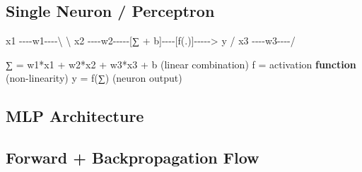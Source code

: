 \documentclass[11pt]{article}
\newenvironment{Shaded}{\begin{snugshade}}{\end{snugshade}}
\newcommand{\FunctionTok}[1]{\textcolor[rgb]{0.56,0.27,0.68}{#1}}
\newcommand{\KeywordTok}[1]{\textcolor[rgb]{0.81,0.81,0.76}{\textbf{#1}}}
\newcommand{\NormalTok}[1]{\textcolor[rgb]{0.81,0.81,0.76}{#1}}
\newcommand{\OperatorTok}[1]{\textcolor[rgb]{0.81,0.81,0.76}{#1}}
\newcommand{\SpecialStringTok}[1]{\textcolor[rgb]{0.85,0.27,0.33}{#1}}
\begin{document}
\subsection{Single Neuron / Perceptron}\label{single-neuron--perceptron}


\begin{Shaded}
\begin{Highlighting}[]
\NormalTok{    x1 }\OperatorTok{{-}{-}{-}{-}}\NormalTok{w1}\OperatorTok{{-}{-}{-}{-}}\NormalTok{\textbackslash{}}
\NormalTok{                  \textbackslash{}}
\NormalTok{    x2 }\OperatorTok{{-}{-}{-}{-}}\NormalTok{w2}\OperatorTok{{-}{-}{-}{-}{-}}\NormalTok{[∑ }\OperatorTok{+}\NormalTok{ b]}\OperatorTok{{-}{-}{-}{-}}\NormalTok{[}\FunctionTok{f}\NormalTok{(}\OperatorTok{.}\NormalTok{)]}\OperatorTok{{-}{-}{-}{-}{-}\textgreater{}}\NormalTok{ y}
                  \OperatorTok{/}
\NormalTok{    x3 }\OperatorTok{{-}{-}{-}{-}}\NormalTok{w3}\OperatorTok{{-}{-}{-}{-}}\SpecialStringTok{/}

\NormalTok{∑ }\OperatorTok{=}\NormalTok{ w1}\OperatorTok{*}\NormalTok{x1 }\OperatorTok{+}\NormalTok{ w2}\OperatorTok{*}\NormalTok{x2 }\OperatorTok{+}\NormalTok{ w3}\OperatorTok{*}\NormalTok{x3 }\OperatorTok{+} \FunctionTok{b}\NormalTok{   (linear combination)}
\NormalTok{f }\OperatorTok{=}\NormalTok{ activation }\KeywordTok{function}\NormalTok{           (non}\OperatorTok{{-}}\NormalTok{linearity)}
\NormalTok{y }\OperatorTok{=} \FunctionTok{f}\NormalTok{(∑)                          (neuron output)}
\end{Highlighting}
\end{Shaded}

\subsection{MLP Architecture}\label{mlp-architecture}


\subsection{Forward + Backpropagation Flow}\label{forward--backpropagation-flow}

\setcodelang{}
\end{document}
